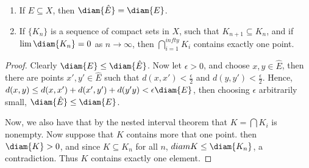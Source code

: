 \begin{theorem}\label{3.3.2}
    \begin{enumerate}[label=(\arabic*)]
        \item If $E \subseteq X$, then  $\diam{\hat{E}}=\diam{E}$.

        \item If $\{K_n\}$ is a sequence of compact sets in  $X$, such that  $K_{n+1} \subseteq K_n$, and 
            if  $\lim{\diam{K_n}}=0$ as  $n \rightarrow \infty$, then  $\bigcap_{i=1}^{infty}{K_i}$ contains 
            exactly one point.
    \end{enumerate}
\end{theorem}
\begin{proof}
    Clearly $\diam{E} \leq \diam{\hat{E}}$. Now let  $\epsilon>0$, and choose  $x,y \in \hat{E}$, then 
    there are points $x',y' \in \hat{E}$ such that  $d(x,x')<\frac{\epsilon}{2}$ and $d(y,y')<
    \frac{\epsilon}{2}$. Hence, $d(x,y) \leq d(x,x')+d(x',y')+d(y'y)<\epsilon \diam{E}$, then 
    choosing  $\epsilon$ arbitrarily small,  $\diam{\hat{E}} \leq \diam{E}$.

    Now, we also have that by the nested interval theorem that $K=\bigcap{K_i}$ is nonempty. Now 
    suppose that  $K$ contains more that one point. then $\diam{K}>0$, and since  $K \subseteq K_n$ for 
    all  $n$,  $diam{K} \leq \diam{K_n}$, a contradiction. Thus  $K$ contains exactly one element.
\end{proof}


